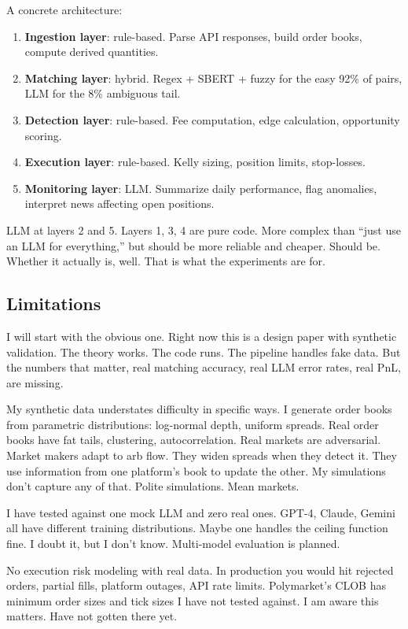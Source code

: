 \documentclass[11pt]{article}
\theoremstyle{definition}
\theoremstyle{remark}
\begin{document}
A concrete architecture:
\begin{enumerate}
  \item \textbf{Ingestion layer}: rule-based. Parse API responses, build order books, compute derived quantities.
  \item \textbf{Matching layer}: hybrid. Regex + SBERT + fuzzy for the easy 92\% of pairs, LLM for the 8\% ambiguous tail.
  \item \textbf{Detection layer}: rule-based. Fee computation, edge calculation, opportunity scoring.
  \item \textbf{Execution layer}: rule-based. Kelly sizing, position limits, stop-losses.
  \item \textbf{Monitoring layer}: LLM. Summarize daily performance, flag anomalies, interpret news affecting open positions.
\end{enumerate}

LLM at layers 2 and 5. Layers 1, 3, 4 are pure code. More complex than ``just use an LLM for everything,'' but should be more reliable and cheaper. Should be. Whether it actually is, well. That is what the experiments are for.

\subsection{Limitations}
\label{sec:limitations}

I will start with the obvious one. Right now this is a design paper with synthetic validation. The theory works. The code runs. The pipeline handles fake data. But the numbers that matter, real matching accuracy, real LLM error rates, real PnL, are missing.

My synthetic data understates difficulty in specific ways. I generate order books from parametric distributions: log-normal depth, uniform spreads. Real order books have fat tails, clustering, autocorrelation. Real markets are adversarial. Market makers adapt to arb flow. They widen spreads when they detect it. They use information from one platform's book to update the other. My simulations don't capture any of that. Polite simulations. Mean markets.

I have tested against one mock LLM and zero real ones. GPT-4, Claude, Gemini all have different training distributions. Maybe one handles the ceiling function fine. I doubt it, but I don't know. Multi-model evaluation is planned.

No execution risk modeling with real data. In production you would hit rejected orders, partial fills, platform outages, API rate limits. Polymarket's CLOB has minimum order sizes and tick sizes I have not tested against. I am aware this matters. Have not gotten there yet.
\end{document}
